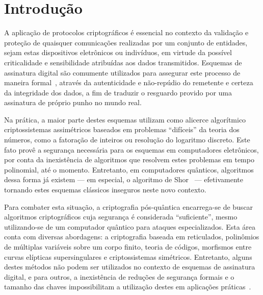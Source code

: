 \documentclass{ufsctex/ufsctex}
\begin{document}
\capa{}
\folhaderosto{}
\folhaaprovacao{}
\paginadedicatoria{}
\paginaagradecimento{}
\paginaepigrafe{}
\paginaresumo{}
\paginaabstract{}

\listadefiguras{}
\listadetabelas{}
\listadeabreviaturas{}
\listadesimbolos{}
\listofalgorithms{}

\sumario{}

\chapter{Introdução}\label{chapter:intro}

A aplicação de protocolos criptográficos é essencial no contexto da validação e
proteção de quaisquer comunicações realizadas por um conjunto de entidades,
sejam estas dispositivos eletrônicos ou indivíduos, em virtude da possível
criticalidade e sensibilidade atribuídas aos dados transmitidos. Esquemas de
assinatura digital são comumente utilizados para assegurar este processo de
maneira formal~\cite[Seção 6.1]{Goldreich:book:2004}, através da
autenticidade e não-repúdio do remetente e certeza da integridade dos dados, a
fim de traduzir o resguardo provido por uma assinatura de próprio punho no
mundo real.

Na prática, a maior parte destes esquemas utilizam como alicerce algorítmico
criptossistemas assimétricos baseados em problemas ``difíceis'' da teoria dos
números, como a fatoração de inteiros ou resolução do logaritmo discreto.  Este
fato provê a segurança necessária para os esquemas em computadores eletrônicos,
por conta da inexistência de algoritmos que resolvem estes
problemas em tempo polinomial, até o momento.  Entretanto, em computadores
quânticos, algoritmos dessa forma já existem --- em especial, o algoritmo de
Shor~\cite{Shor:article:1997:oct} --- efetivamente tornando estes esquemas
clássicos inseguros neste novo contexto.

Para combater esta situação, a criptografia pós-quântica encarrega-se de buscar
algoritmos criptográficos cuja segurança é considerada ``suficiente'', mesmo
utilizando-se de um computador quântico para ataques especializados. Esta área
conta com diversas abordagens: a criptografia baseada em reticulados,
polinômios de múltiplas variáveis sobre um corpo finito, teoria de códigos,
morfismos entre curvas elípticas supersingulares e criptossistemas simétricos.
Entretanto, alguns destes métodos não podem ser utilizados no contexto de
esquemas de assinatura digital, e para outros, a inexistência de reduções de
segurança formais e o tamanho das chaves impossibilitam a utilização destes em
aplicações práticas~\cite{Bernstein:article:2017:sep}.
\end{document}
